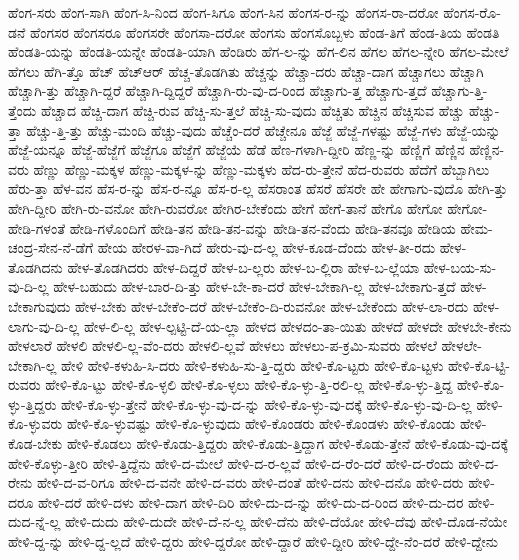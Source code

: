 {ಹೆಂಗ-ಸರು
ಹೆಂಗ-ಸಾಗಿ
ಹೆಂಗ-ಸಿ-ನಿಂದ
ಹೆಂಗ-ಸಿಗೂ
ಹೆಂಗ-ಸಿನ
ಹೆಂಗಸ-ರ-ನ್ನು
ಹೆಂಗಸ-ರಾ-ದರೋ
ಹೆಂಗಸ-ರೊ-ಡನೆ
ಹೆಂಗಸರ
ಹೆಂಗಸರೂ
ಹೆಂಗಸರೇ
ಹೆಂಗಸಾ-ದರೋ
ಹೆಂಗಸು
ಹೆಂಗಸೊಬ್ಬಳು
ಹೆಂಡ-ತಿಗೆ
ಹೆಂಡ-ತಿಯ
ಹೆಂಡತಿ
ಹೆಂಡತಿ-ಯನ್ನು
ಹೆಂಡತಿ-ಯನ್ನೇ
ಹೆಂಡತಿ-ಯಾಗಿ
ಹೆಂಡಿರು
ಹೆಗ-ಲ-ನ್ನು
ಹೆಗ-ಲಿನ
ಹೆಗಲ
ಹೆಗಲ-ನ್ನೇರಿ
ಹೆಗಲ-ಮೇಲೆ
ಹೆಗಲು
ಹೆಗಿ-ತ್ತೊ
ಹೆಚ್
ಹೆಚ್ಆರ್
ಹೆಚ್ಚ-ತೊಡಗಿತು
ಹೆಚ್ಚನ್ನು
ಹೆಚ್ಚಾ-ದರು
ಹೆಚ್ಚಾ-ದಾಗ
ಹೆಚ್ಚಾಗಲು
ಹೆಚ್ಚಾಗಿ
ಹೆಚ್ಚಾಗಿ-ತ್ತು
ಹೆಚ್ಚಾಗಿ-ದ್ದರೆ
ಹೆಚ್ಚಾಗಿ-ದ್ದಿದ್ದರೆ
ಹೆಚ್ಚಾಗಿ-ರು-ವು-ದ-ರಿಂದ
ಹೆಚ್ಚಾಗು-ತ್ತ
ಹೆಚ್ಚಾಗು-ತ್ತದೆ
ಹೆಚ್ಚಾಗು-ತ್ತಿ-ತ್ತೆಂದು
ಹೆಚ್ಚಾದ
ಹೆಚ್ಚಿ-ದಾಗ
ಹೆಚ್ಚಿ-ರುವ
ಹೆಚ್ಚಿ-ಸು-ತ್ತಲೆ
ಹೆಚ್ಚಿ-ಸು-ವುದು
ಹೆಚ್ಚಿತು
ಹೆಚ್ಚಿನ
ಹೆಚ್ಚಿಸುವ
ಹೆಚ್ಚು
ಹೆಚ್ಚು-ತ್ತಾ
ಹೆಚ್ಚು-ತ್ತಿ-ತ್ತು
ಹೆಚ್ಚು-ಮಂದಿ
ಹೆಚ್ಚು-ವುದು
ಹೆಚ್ಚೆಂ-ದರೆ
ಹೆಚ್ಚೇನೂ
ಹೆಜ್ಜೆ
ಹೆಜ್ಜೆ-ಗಳಷ್ಟು
ಹೆಜ್ಜೆ-ಗಳು
ಹೆಜ್ಜೆ-ಯನ್ನು
ಹೆಜ್ಜೆ-ಯನ್ನೂ
ಹೆಜ್ಜೆ-ಹೆಜ್ಜೆಗೆ
ಹೆಜ್ಜೆಗೂ
ಹೆಜ್ಜೆಗೆ
ಹೆಜ್ಜೆಯೆ
ಹೆಡೆ
ಹೆಣ-ಗಳಾಗಿ-ದ್ದೀರಿ
ಹೆಣ್ಣ-ನ್ನು
ಹೆಣ್ಣಿಗೆ
ಹೆಣ್ಣಿನ
ಹೆಣ್ಣಿನ-ವರು
ಹೆಣ್ಣು
ಹೆಣ್ಣು-ಮಕ್ಕಳ
ಹೆಣ್ಣು-ಮಕ್ಕಳ-ನ್ನು
ಹೆಣ್ಣು-ಮಕ್ಕಳು
ಹೆದ-ರು-ತ್ತೇನೆ
ಹೆದ-ರುವರು
ಹೆದೆಗೆ
ಹೆಬ್ಬಾಗಿಲು
ಹೆರು-ತ್ತಾ
ಹೆಳ-ವನ
ಹೆಸ-ರ-ನ್ನು
ಹೆಸ-ರ-ನ್ನೂ
ಹೆಸ-ರ-ಲ್ಲ
ಹೆಸರಾಂತ
ಹೆಸರೆ
ಹೆಸರೇ
ಹೇ
ಹೇಗಾಗು-ವುದೊ
ಹೇಗಿ-ತ್ತು
ಹೇಗಿ-ದ್ದೀರಿ
ಹೇಗಿ-ರು-ವನೋ
ಹೇಗಿ-ರುವರೋ
ಹೇಗಿರ-ಬೇಕೆಂದು
ಹೇಗೆ
ಹೇಗೆ-ತಾನೆ
ಹೇಗೊ
ಹೇಗೋ
ಹೇಗೋ-ಹೇಡಿ-ಗಳಂತೆ
ಹೇಡಿ-ಗಳೊಂದಿಗೆ
ಹೇಡಿ-ತನ
ಹೇಡಿ-ತನ-ವನ್ನು
ಹೇಡಿ-ತನ-ವೆಂದು
ಹೇಡಿ-ತನವೂ
ಹೇಡಿಯ
ಹೇಮ-ಚಂದ್ರ-ಸೇನ-ನೆ-ಡೆಗೆ
ಹೇಯ
ಹೇರಳ-ವಾ-ಗಿದೆ
ಹೇರು-ವು-ದ-ಲ್ಲ
ಹೇಳ-ಕೂಡ-ದೆಂದು
ಹೇಳ-ತೀ-ರದು
ಹೇಳ-ತೊಡಗಿದನು
ಹೇಳ-ತೊಡಗಿದರು
ಹೇಳ-ದಿದ್ದರೆ
ಹೇಳ-ಬ-ಲ್ಲರು
ಹೇಳ-ಬ-ಲ್ಲಿರಾ
ಹೇಳ-ಬ-ಲ್ಲೆಯಾ
ಹೇಳ-ಬಯ-ಸು-ವು-ದಿ-ಲ್ಲ
ಹೇಳ-ಬಹುದು
ಹೇಳ-ಬಾರ-ದಿ-ತ್ತು
ಹೇಳ-ಬೇ-ಕಾ-ದರೆ
ಹೇಳ-ಬೇಕಾಗಿ-ಲ್ಲ
ಹೇಳ-ಬೇಕಾಗು-ತ್ತದೆ
ಹೇಳ-ಬೇಕಾಗುವುದು
ಹೇಳ-ಬೇಕು
ಹೇಳ-ಬೇಕೆಂ-ದರೆ
ಹೇಳ-ಬೇಕೆಂ-ದಿ-ರುವನೋ
ಹೇಳ-ಬೇಕೆಂದು
ಹೇಳ-ಲಾ-ರದು
ಹೇಳ-ಲಾಗು-ವು-ದಿ-ಲ್ಲ
ಹೇಳ-ಲಿ-ಲ್ಲ
ಹೇಳ-ಲ್ಪಟ್ಟಿ-ದೆ-ಯ-ಲ್ಲಾ
ಹೇಳದ
ಹೇಳದಂ-ತಾ-ಯಿತು
ಹೇಳದೆ
ಹೇಳದೇ
ಹೇಳಬೇ-ಕೇನು
ಹೇಳಲಾರೆ
ಹೇಳಲಿ
ಹೇಳಲಿ-ಲ್ಲ-ವೆಂ-ದರು
ಹೇಳಲಿ-ಲ್ಲವೆ
ಹೇಳಲು
ಹೇಳಲು-ಪ-ಕ್ರಮಿ-ಸುವರು
ಹೇಳಲೆ
ಹೇಳಲೇ-ಬೇಕಾಗಿ-ಲ್ಲ
ಹೇಳಿ
ಹೇಳಿ-ಕಳುಹಿ-ಸಿ-ದರು
ಹೇಳಿ-ಕಳುಹಿ-ಸು-ತ್ತಿ-ದ್ದರು
ಹೇಳಿ-ಕೊ-ಟ್ಟರು
ಹೇಳಿ-ಕೊ-ಟ್ಟಳು
ಹೇಳಿ-ಕೊ-ಟ್ಟಿ-ರುವರು
ಹೇಳಿ-ಕೊ-ಟ್ಟು
ಹೇಳಿ-ಕೊ-ಳ್ಳಲಿ
ಹೇಳಿ-ಕೊ-ಳ್ಳಲು
ಹೇಳಿ-ಕೊ-ಳ್ಳು-ತ್ತಿ-ರಲಿ-ಲ್ಲ
ಹೇಳಿ-ಕೊ-ಳ್ಳು-ತ್ತಿದ್ದ
ಹೇಳಿ-ಕೊ-ಳ್ಳು-ತ್ತಿದ್ದರು
ಹೇಳಿ-ಕೊ-ಳ್ಳು-ತ್ತೇನೆ
ಹೇಳಿ-ಕೊ-ಳ್ಳು-ವು-ದ-ನ್ನು
ಹೇಳಿ-ಕೊ-ಳ್ಳು-ವು-ದಕ್ಕೆ
ಹೇಳಿ-ಕೊ-ಳ್ಳು-ವು-ದಿ-ಲ್ಲ
ಹೇಳಿ-ಕೊ-ಳ್ಳುವರು
ಹೇಳಿ-ಕೊ-ಳ್ಳುವಷ್ಟು
ಹೇಳಿ-ಕೊ-ಳ್ಳುವುದು
ಹೇಳಿ-ಕೊಂಡರು
ಹೇಳಿ-ಕೊಂಡಳು
ಹೇಳಿ-ಕೊಂಡು
ಹೇಳಿ-ಕೊಡ-ಬೇಕು
ಹೇಳಿ-ಕೊಡಲು
ಹೇಳಿ-ಕೊಡು-ತ್ತಿದ್ದರು
ಹೇಳಿ-ಕೊಡು-ತ್ತಿದ್ದಾಗ
ಹೇಳಿ-ಕೊಡು-ತ್ತೇನೆ
ಹೇಳಿ-ಕೊಡು-ವು-ದಕ್ಕೆ
ಹೇಳಿ-ಕೊಳ್ಳು-ತ್ತೀರಿ
ಹೇಳಿ-ತ್ತಿದ್ದೆನು
ಹೇಳಿ-ದ-ಮೇಲೆ
ಹೇಳಿ-ದ-ರ-ಲ್ಲವೆ
ಹೇಳಿ-ದ-ರೆಂ-ದರೆ
ಹೇಳಿ-ದ-ರೆಂದು
ಹೇಳಿ-ದ-ರೇನು
ಹೇಳಿ-ದ-ವ-ರಿಗೂ
ಹೇಳಿ-ದ-ವನೇ
ಹೇಳಿ-ದ-ವರು
ಹೇಳಿ-ದಂತೆ
ಹೇಳಿ-ದನು
ಹೇಳಿ-ದನೊ
ಹೇಳಿ-ದರು
ಹೇಳಿ-ದರೂ
ಹೇಳಿ-ದರೆ
ಹೇಳಿ-ದಳು
ಹೇಳಿ-ದಾಗ
ಹೇಳಿ-ದಿರಿ
ಹೇಳಿ-ದು-ದ-ನ್ನು
ಹೇಳಿ-ದು-ದ-ರಿಂದ
ಹೇಳಿ-ದು-ದರ
ಹೇಳಿ-ದುದ-ನ್ನೆ-ಲ್ಲ
ಹೇಳಿ-ದುದು
ಹೇಳಿ-ದುದೇ
ಹೇಳಿ-ದೆ-ನ-ಲ್ಲ
ಹೇಳಿ-ದೆನು
ಹೇಳಿ-ದೆಯೋ
ಹೇಳಿ-ದೆವು
ಹೇಳಿ-ದೊಡ-ನೆಯೇ
ಹೇಳಿ-ದ್ದ-ನ್ನು
ಹೇಳಿ-ದ್ದ-ಲ್ಲದೆ
ಹೇಳಿ-ದ್ದರು
ಹೇಳಿ-ದ್ದರೋ
ಹೇಳಿ-ದ್ದಾರೆ
ಹೇಳಿ-ದ್ದೀರಿ
ಹೇಳಿ-ದ್ದೇ-ನೆಂ-ದರೆ
ಹೇಳಿ-ದ್ದೇನು
}
